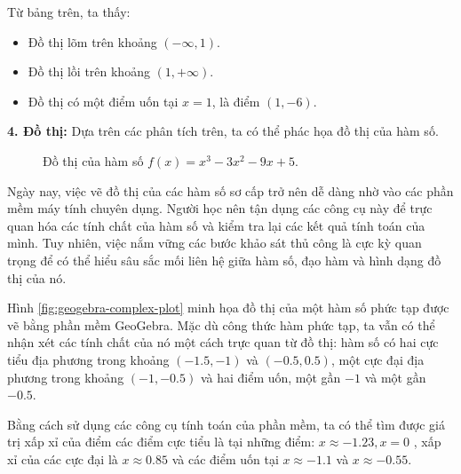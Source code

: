 \begin{example}
Từ bảng trên, ta thấy: 
\begin{itemize}
    \item Đồ thị lõm trên khoảng $(-\infty, 1)$.
    \item Đồ thị lồi trên khoảng $(1, +\infty)$.
    \item Đồ thị có một điểm uốn tại $x=1$, là điểm $(1, -6)$.
\end{itemize}
\textbf{4. Đồ thị:}
Dựa trên các phân tích trên, ta có thể phác họa đồ thị của hàm số.

\begin{figure}[H]
    \centering
    \caption{Đồ thị của hàm số $f(x) = x^3 - 3x^2 - 9x + 5$.}
    \label{fig:cubic-function-graph}
\end{figure}
\end{example}

Ngày nay, việc vẽ đồ thị của các hàm số sơ cấp trở nên dễ dàng nhờ vào các phần mềm máy tính chuyên dụng. Người học nên tận dụng các công cụ này để trực quan hóa các tính chất của hàm số và kiểm tra lại các kết quả tính toán của mình. Tuy nhiên, việc nắm vững các bước khảo sát thủ công là cực kỳ quan trọng để có thể hiểu sâu sắc mối liên hệ giữa hàm số, đạo hàm và hình dạng đồ thị của nó.

\begin{example}
Hình \ref{fig:geogebra-complex-plot} minh họa đồ thị của một hàm số phức tạp được vẽ bằng phần mềm GeoGebra. Mặc dù công thức hàm phức tạp, ta vẫn có thể nhận xét các tính chất của nó một cách trực quan từ đồ thị: hàm số có hai cực tiểu địa phương trong khoảng $(-1.5, -1)$ và $(-0.5, 0.5)$, một cực đại địa phương trong khoảng $(-1, -0.5)$ và hai điểm uốn, một gần $-1$ và một gần $-0.5$.

Bằng cách sử dụng các công cụ tính toán của phần mềm, ta có thể tìm được giá trị xấp xỉ của điểm các điểm cực tiểu là tại những điểm: $x \approx -1.23, x = 0$ , xấp xỉ của các cực đại là $x \approx 0.85$ và các điểm uốn tại $x \approx -1.1$ và $x \approx -0.55$.
\end{example}

